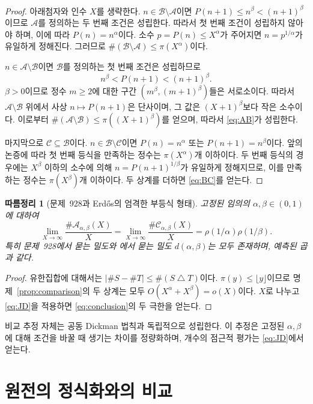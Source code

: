 \documentclass[11pt,a4paper]{amsart}
\theoremstyle{korplain}
\newtheorem{corollary}[proposition]{따름정리}
\newcommand{\A}{\mathcal A}
\newcommand{\B}{\mathcal B}
\newcommand{\C}{\mathcal C}
\begin{document}
\begin{proof}
아래첨자와 인수 $X$를 생략한다.
$n\in\B\setminus\A$이면 $P(n+1)\le n^\beta<(n+1)^\beta$이므로
$\A$를 정의하는 두 번째 조건은 성립한다.
따라서 첫 번째 조건이 성립하지 않아야 하며, 이에 따라 $P(n)=n^\alpha$이다.
소수 $p=P(n)\le X^\alpha$가 주어지면 $n=p^{1/\alpha}$가 유일하게 정해진다.
그러므로 $\#(\B\setminus\A)\le\pi(X^\alpha)$이다.

$n\in\A\setminus\B$이면 $\B$를 정의하는 첫 번째 조건은 성립하므로
\[
 n^\beta<P(n+1)<(n+1)^\beta.
\]
$\beta>0$이므로 정수 $m\ge2$에 대한 구간
$(m^\beta,(m+1)^\beta)$들은 서로소이다.
따라서 $\A\setminus\B$ 위에서 사상 $n\mapsto P(n+1)$은 단사이며,
그 값은 $(X+1)^\beta$보다 작은 소수이다.
이로부터 $\#(\A\setminus\B)\le\pi((X+1)^\beta)$를 얻으며,
따라서 \eqref{eq:AB}가 성립한다.

마지막으로 $\C\subseteq\B$이다.
$n\in\B\setminus\C$이면 $P(n)=n^\alpha$ 또는 $P(n+1)=n^\beta$이다.
앞의 논증에 따라 첫 번째 등식을 만족하는 정수는 $\pi(X^\alpha)$개 이하이다.
두 번째 등식의 경우에는 $X^\beta$ 이하의 소수에 의해
$n=P(n+1)^{1/\beta}$가 유일하게 정해지므로,
이를 만족하는 정수는 $\pi(X^\beta)$개 이하이다.
두 상계를 더하면 \eqref{eq:BC}를 얻는다.
\end{proof}

\begin{corollary}[문제~928과 Erd\H{o}s의 엄격한 부등식 형태]\label{cor:density}
고정된 임의의 $\alpha,\beta\in(0,1)$에 대하여
\begin{equation}\label{eq:conclusion}
 \lim_{X\to\infty}\frac{\#\A_{\alpha,\beta}(X)}X
 =\lim_{X\to\infty}\frac{\#\C_{\alpha,\beta}(X)}X
 =\rho(1/\alpha)\rho(1/\beta).
\end{equation}
특히 문제~928에서 묻는 밀도와
\cite[25쪽]{Erdos1976Manitoba}에서 묻는 밀도 $d(\alpha,\beta)$는
모두 존재하며, 예측된 곱과 같다.
\end{corollary}

\begin{proof}
유한집합에 대해서는 $|\#S-\#T|\le\#(S\mathbin\triangle T)$이다.
$\pi(y)\le\lfloor y\rfloor$이므로 명제~\ref{prop:comparison}의 두 상계는
모두 $O(X^\alpha+X^\beta)=o(X)$이다.
$X$로 나누고 \eqref{eq:JD}을 적용하면 \eqref{eq:conclusion}의 두 극한을 얻는다.
\end{proof}

비교 추정 자체는 공동 Dickman 법칙과 독립적으로 성립한다.
이 추정은 고정된 $\alpha,\beta$에 대해 조건을 바꿀 때 생기는 차이를 정량화하며,
개수의 점근적 평가는 \eqref{eq:JD}에서 얻는다.

\section{원전의 정식화와의 비교}\label{sec:sources}
\end{document}
